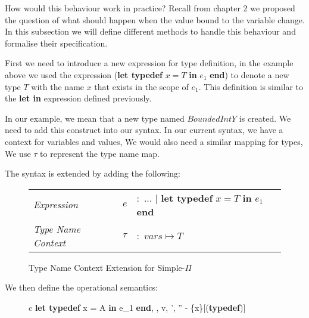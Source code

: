 \documentclass[a4paper,12pt]{report}
\begin{document}
\par
How would this behaviour work in practice? Recall from chapter 2 we proposed the 
question of what should happen when the value bound to the variable change. In 
this subsection we will define different methods to handle this behaviour and 
formalise their specification.

\par
First we need to introduce a new expression for type definition, in the example 
above we used the expression (\textbf{let typedef} $x = T$ \textbf{ in }$e_1$ \textbf {end}) 
to denote a new type $T$ with the name $x$ that exists in the scope of $e_1$. 
This definition is similar to the \textbf{let in} expression defined previously. 

In our example, we mean 
that a new type named $BoundedIntY$ is created. We need to add this construct 
into our syntax. In our current syntax, we have a context for variables and 
values, We would also need a similar mapping for types, We use $\tau$ to 
represent the type name map. 

\par
The syntax is extended by adding the following: 
\begin{figure}[H]
  \begin{center}
    \begin{tabular} {l l l}
      \textit{Expression} & $e$ & $:$ ... $|$ \textbf{let typedef }$x = T\textbf{ in } e_1$ \textbf{ end} \\
      \textit{Type Name Context} & $\tau$& $:$ $vars \mapsto T$ \\
    \end{tabular}
  \end{center}
  \caption{Type Name Context Extension for Simple-$\Pi$}
\end{figure}

\par
We then define the operational semantics: 

\begin{figure}[H]
  \begin{center}
    \begin{tabular} {c}
      {\langle \textbf{let typedef }x = A \textbf{ in }e_1\textbf{ end}, 
      \sigma, \tau \rangle \longrightarrow 
        \langle v, \sigma', \tau'' - \{x\}\rangle}[(\textbf{typedef})] \text{ }    
    \end{tabular}
  \end{center}
\end{figure}
\end{document}
